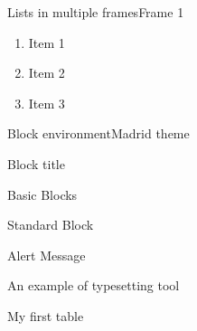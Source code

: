 \documentclass{beamer}
\newcounter{currentenumi}
\begin{document}
 \begin{frame}{Lists in multiple frames}{Frame 1}
 \begin{enumerate}
     \item Item 1
     \item Item 2
     \item Item 3
     \setcounter{currentenumi}{\theenumi}
 \end{enumerate}
 \end{frame}



 \begin{frame}{Block environment}{Madrid theme}
 \begin{block}{Block title}
 \end{block}
 \end{frame}

 \begin{frame}{Basic Blocks}
     \begin{block}{Standard Block}
     \end{block}
     \begin{alertblock}{Alert Message}
     \end{alertblock}
     \begin{exampleblock}{An example of typesetting tool}
     \end{exampleblock}
 \end{frame}


 \begin{frame}{My first table}
 \begin{tabular}{|c||l||r|}
 \hline
 \hline
 \hline
 \hline
 \end{tabular}
 \end{frame}
\end{document}
